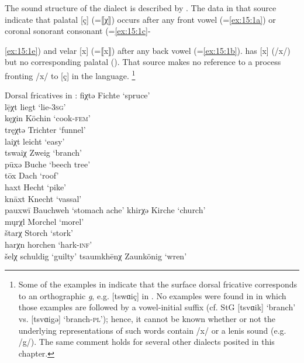 The sound structure of the  dialect is described by \citet{Weinelt1940}. The data in that source indicate that palatal [ç] (=⟦χ⟧) occurs after any front vowel (=\ref{ex:15:1a}) or coronal sonorant consonant (=\ref{ex:15:1c}-{\ref{ex:15:1e}) and velar [x] (=⟦x⟧) after any back vowel (=\ref{ex:15:1b}).  has [x] (/x/) but no corresponding palatal (\citealt{ŠimáčkováChládková2012}). That source makes no reference to a process fronting /x/ to [ç] in the  language. \footnote{Some of the examples in  indicate that the surface dorsal fricative corresponds to an orthographic \textit{g}, e.g. [tswɑiç] in . No examples were found in \citet{Weinelt1940} in which those examples are followed by a vowel-initial suffix (cf. StG [tsvɑik] ‘branch’ vs. [tsvɑigə] ‘branch-\textsc{pl}’); hence, it cannot be known whether or not the underlying representations of such words contain /x/ or a lenis sound (e.g. /g/). The same comment holds for several other dialects posited in this chapter.}

\ea%
\label{ex:15:1}Dorsal fricatives in :
\ea\label{ex:15:1a} fiχtə \tab  [fiçtə] \tab Fichte \tab ‘spruce’ \\
lẹ̄χt  \tab  [leːçt] \tab liegt \tab ‘lie-\textsc{3sg}’ \\
kęχin \tab [kɛçin] \tab Köchin \tab ‘cook-\textsc{fem}’ \\
tręχtə \tab [trɛçtə] \tab Trichter \tab ‘funnel’ \\
laiχt \tab  [lɑiçt] \tab leicht \tab ‘easy’ \\
tswaiχ \tab [tswɑiç] \tab Zweig \tab ‘branch’ \\
\ex\label{ex:15:1b} pūxə \tab [puːxə] \tab Buche \tab ‘beech tree’ \\
tōx  \tab  [toːx] \tab Dach \tab ‘roof’ \\
haxt \tab [hɑxt] \tab Hecht \tab ‘pike’ \\
knāxt \tab [knɑːxt] \tab Knecht \tab ‘vassal’ \\
pauxwī \tab [pauxwiː] \tab Bauchweh \tab ‘stomach ache’ 
\ex\label{ex:15:1c} khirχə \tab [kʰirçə] \tab Kirche \tab ‘church’ \\
m\k{u}rχl \tab [mʊrçl̩] \tab Morchel \tab ‘morel’ \\
štarχ \tab [ʃtɑrç] \tab Storch \tab ‘stork’ \\
harχn \tab [hɑrçn̩] \tab horchen \tab ‘hark-\textsc{inf}’ \\
\ex\label{ex:15:1d} šelχ  \tab  [ʃelç] \tab schuldig \tab ‘guilty’ 
\ex\label{ex:15:1e} tsaumkhēnχ \tab [tsaumkʰeːnç] \tab Zaunkönig \tab ‘wren’ 
\z
\z

}
